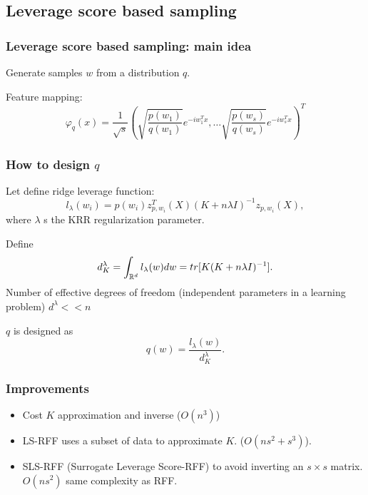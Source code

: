 \subsection*{Leverage score based sampling}

\begin{frame}
  \frametitle{Leverage score based sampling: main idea}
Generate samples $w$ from a distribution $q$. 

Feature mapping: 
\begin{equation}
  \varphi_q(x)
  =
  \frac{1}{\sqrt{s}}
  \left(
    \sqrt{\frac{p(w_1)}{q(w_1)}} e^{-i w_1^T x},
    \ldots
    \sqrt{\frac{p(w_s)}{q(w_s)}} e^{-i w_s^T x}
  \right)^T
\end{equation}
  
\end{frame}

\begin{frame}
  \frametitle{How to design $q$}
  Let define ridge leverage function:
  \begin{equation}
    l_\lambda(w_i)
    =
    p(w_i)
    z_{p,w_i}^T(X)(K + n \lambda I)^{-1}
    z_{p,w_i}(X),
  \end{equation}
  where $\lambda$ s the KRR regularization parameter.

  Define
  \begin{equation}
    d_K^\lambda
    = 
    \int_{\mathbb{R}^d} l_\lambda(w) dw
    = 
    tr[K(K + n \lambda I)^{-1}].
  \end{equation}
  Number of effective degrees of freedom (independent parameters in a learning problem)
 $d^{\lambda} << n$

 {$q$ is designed as}
  \begin{equation}
    q(w)
    = 
    \frac{l_\lambda(w)}{d^\lambda_K}.
  \end{equation}

\end{frame}

\begin{frame}
  \frametitle{Improvements}
  \begin{itemize}
    \item Cost $K$ approximation and inverse ($O(n^3)$)
    \item LS-RFF uses a subset of data to approximate $K$. ($O(ns^2 + s^3)$).
    \item SLS-RFF (Surrogate Leverage Score-RFF) to avoid inverting an $s \times s$ matrix.$O(ns^2)$ same complexity as RFF.    
  \end{itemize}


\end{frame}

